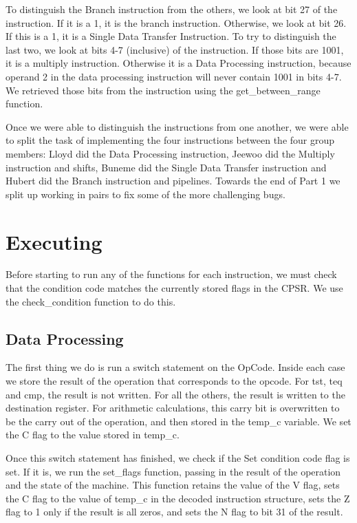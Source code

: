 \documentclass[a4paper]{article}
\begin{document}
To distinguish the Branch instruction from the others, we look at bit 27 of the instruction. If it is a 1, it is the branch instruction. Otherwise, we look at bit 26. If this is a 1, it is a Single Data Transfer Instruction. To try to distinguish the last two, we look at bits 4-7 (inclusive) of the instruction. If those bits are 1001, it is a multiply instruction. Otherwise it is a Data Processing instruction, because operand 2 in the data processing instruction will never contain 1001 in bits 4-7. We retrieved those bits from the instruction using the get\_between\_range function.

Once we were able to distinguish the instructions from one another, we were able to split the task of implementing the four instructions between the four group members: Lloyd did the Data Processing instruction, Jeewoo did the Multiply instruction and shifts, Buneme did the Single Data Transfer instruction and Hubert did the Branch instruction and pipelines. Towards the end of Part 1 we split up working in pairs to fix some of the more challenging bugs.

\section{Executing}
Before starting to run any of the functions for each instruction, we must check that the condition code matches the currently stored flags in the CPSR. We use the check\_condition function to do this.

\subsection{Data Processing}
The first thing we do is run a switch statement on the OpCode. Inside each case we store the result of the operation that corresponds to the opcode. For tst, teq and cmp, the result is not written. For all the others, the result is written to the destination register. For arithmetic calculations, this carry bit is overwritten to be the carry out of the operation, and then stored in the temp\_c variable. We set the C flag to the value stored in temp\_c.

Once this switch statement has finished, we check if the Set condition code flag is set. If it is, we run the set\_flags function, passing in the result of the operation and the state of the machine. This function retains the value of the V flag, sets the C flag to the value of temp\_c in the decoded instruction structure, sets the Z flag to 1 only if the result is all zeros, and sets the N flag to bit 31 of the result.
\end{document}
